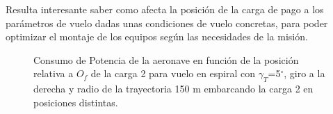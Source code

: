 Resulta interesante saber como afecta la posición de la carga de pago a los parámetros de vuelo dadas unas condiciones de vuelo concretas, para poder optimizar el montaje de los equipos según las necesidades de la misión.

\begin{figure}
	\centering
	\caption{Consumo de Potencia de la aeronave en función de la posición relativa a $O_f$ de la carga 2 para vuelo en espiral con $\gamma_T$=5$^\circ$, giro a la derecha y radio de la trayectoria 150 m embarcando la carga 2 en posiciones distintas.}
	\label{PMVE2lxy}
\end{figure}
